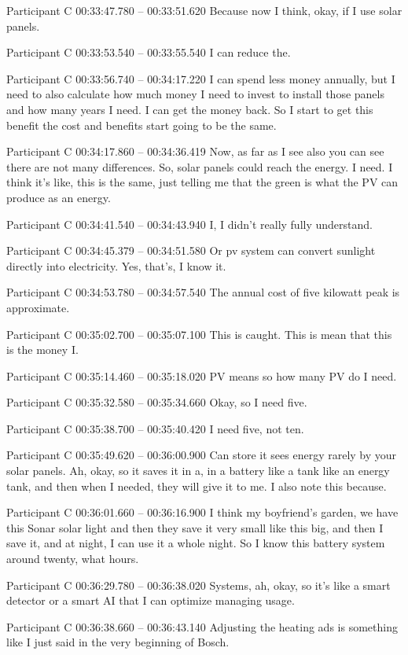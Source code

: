 {Participant C 00:33:47.780 -- 00:33:51.620
Because now I think, okay, if I use solar panels.

Participant C 00:33:53.540 -- 00:33:55.540
I can reduce the.

Participant C 00:33:56.740 -- 00:34:17.220
I can spend less money annually, but I need to also calculate how much money I need to invest to install those panels and how many years I need. I can get the money back. So I start to get this benefit the cost and benefits start going to be the same.

Participant C 00:34:17.860 -- 00:34:36.419
Now, as far as I see also you can see there are not many differences. So, solar panels could reach the energy. I need. I think it's like, this is the same, just telling me that the green is what the PV can produce as an energy.

Participant C 00:34:41.540 -- 00:34:43.940
I, I didn't really fully understand.

Participant C 00:34:45.379 -- 00:34:51.580
Or pv system can convert sunlight directly into electricity. Yes, that's, I know it.

Participant C 00:34:53.780 -- 00:34:57.540
The annual cost of five kilowatt peak is approximate.

Participant C 00:35:02.700 -- 00:35:07.100
This is caught. This is mean that this is the money I.

Participant C 00:35:14.460 -- 00:35:18.020
PV means so how many PV do I need.

Participant C 00:35:32.580 -- 00:35:34.660
Okay, so I need five.

Participant C 00:35:38.700 -- 00:35:40.420
I need five, not ten.

Participant C 00:35:49.620 -- 00:36:00.900
Can store it sees energy rarely by your solar panels. Ah, okay, so it saves it in a, in a battery like a tank like an energy tank, and then when I needed, they will give it to me. I also note this because.

Participant C 00:36:01.660 -- 00:36:16.900
I think my boyfriend's garden, we have this Sonar solar light and then they save it very small like this big, and then I save it, and at night, I can use it a whole night. So I know this battery system around twenty, what hours.

Participant C 00:36:29.780 -- 00:36:38.020
Systems, ah, okay, so it's like a smart detector or a smart AI that I can optimize managing usage.

Participant C 00:36:38.660 -- 00:36:43.140
Adjusting the heating ads is something like I just said in the very beginning of Bosch.

}
